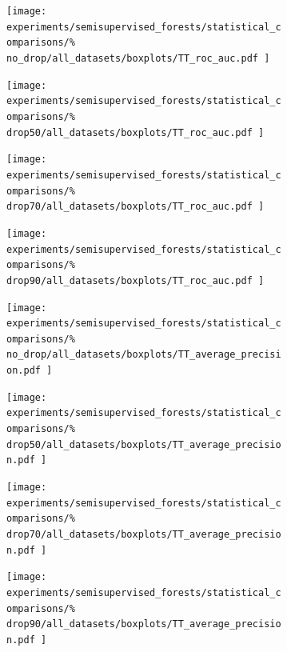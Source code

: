 \begin{figure}[tb]
    \begin{subfigure}{0.24\textwidth}
        \texttt{[image: 
            experiments/semisupervised\_forests/statistical\_comparisons/\%
            no\_drop/all\_datasets/boxplots/TT\_roc\_auc.pdf
        ]}
    \end{subfigure}
    \begin{subfigure}{0.24\textwidth}
        \texttt{[image: 
            experiments/semisupervised\_forests/statistical\_comparisons/\%
            drop50/all\_datasets/boxplots/TT\_roc\_auc.pdf
        ]}
    \end{subfigure}
    \begin{subfigure}{0.24\textwidth}
        \texttt{[image: 
            experiments/semisupervised\_forests/statistical\_comparisons/\%
            drop70/all\_datasets/boxplots/TT\_roc\_auc.pdf
        ]}
    \end{subfigure}
    \begin{subfigure}{0.24\textwidth}
        \texttt{[image: 
            experiments/semisupervised\_forests/statistical\_comparisons/\%
            drop90/all\_datasets/boxplots/TT\_roc\_auc.pdf
        ]}
    \end{subfigure}

    \begin{subfigure}{0.24\textwidth}
        \texttt{[image: 
            experiments/semisupervised\_forests/statistical\_comparisons/\%
            no\_drop/all\_datasets/boxplots/TT\_average\_precision.pdf
        ]}
    \end{subfigure}
    \begin{subfigure}{0.24\textwidth}
        \texttt{[image: 
            experiments/semisupervised\_forests/statistical\_comparisons/\%
            drop50/all\_datasets/boxplots/TT\_average\_precision.pdf
        ]}
    \end{subfigure}
    \begin{subfigure}{0.24\textwidth}
        \texttt{[image: 
            experiments/semisupervised\_forests/statistical\_comparisons/\%
            drop70/all\_datasets/boxplots/TT\_average\_precision.pdf
        ]}
    \end{subfigure}
    \begin{subfigure}{0.24\textwidth}
        \texttt{[image: 
            experiments/semisupervised\_forests/statistical\_comparisons/\%
            drop90/all\_datasets/boxplots/TT\_average\_precision.pdf
        ]}
    \end{subfigure}


\end{figure}
